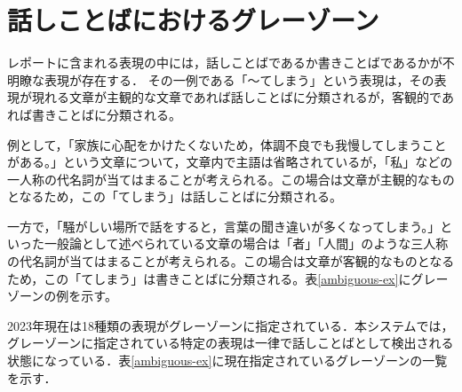 \section{話しことばにおけるグレーゾーン}
レポートに含まれる表現の中には，話しことばであるか書きことばであるかが不明瞭な表現が存在する．
その一例である「～てしまう」という表現は，その表現が現れる文章が主観的な文章であれば話しことばに分類されるが，客観的であれば書きことばに分類される。

例として，「家族に心配をかけたくないため，体調不良でも我慢してしまうことがある。」という文章について，文章内で主語は省略されているが，「私」などの一人称の代名詞が当てはまることが考えられる。この場合は文章が主観的なものとなるため，この「てしまう」は話しことばに分類される。

一方で，「騒がしい場所で話をすると，言葉の聞き違いが多くなってしまう。」といった一般論として述べられている文章の場合は「者」「人間」のような三人称の代名詞が当てはまることが考えられる。この場合は文章が客観的なものとなるため，この「てしまう」は書きことばに分類される。表\ref{ambiguous-ex}にグレーゾーンの例を示す。



2023年現在は18種類の表現がグレーゾーンに指定されている．本システムでは，グレーゾーンに指定されている特定の表現は一律で話しことばとして検出される状態になっている．表\ref{ambiguous-ex}に現在指定されているグレーゾーンの一覧を示す．

